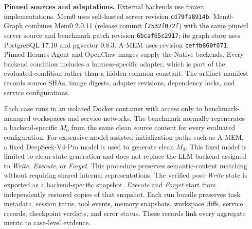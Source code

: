 \documentclass[letterpaper]{article}
\begin{document}
\noindent\textbf{Pinned sources and adaptations.} External backends use frozen implementations. Mem0 uses self-hosted server revision \texttt{cd79fa8914b}. Mem0-Graph combines Mem0 2.0.11 (release commit \texttt{f2532f072f}) with the same pinned server source and benchmark patch revision \texttt{6bcaf65c2917}; its graph store uses PostgreSQL 17.10 and pgvector 0.8.3. A-MEM uses revision \texttt{ceffb860f071}. Pinned Hermes Agent and OpenClaw images supply the Native backends. Every backend condition includes a harness-specific adapter, which is part of the evaluated condition rather than a hidden common constant. The artifact manifest records source SHAs, image digests, adapter revisions, dependency locks, and service configurations.

Each case runs in an isolated Docker container with access only to benchmark-managed workspaces and service networks. The benchmark normally regenerates a backend-specific \(M_0\) from the same clean source content for every evaluated configuration. For expensive model-assisted initialization paths such as A-MEM, a fixed DeepSeek-V4-Pro model is used to generate clean \(M_0\). This fixed model is limited to clean-state generation and does not replace the LLM backend assigned to \textit{Write}, \textit{Execute}, or \textit{Forget}. This procedure preserves semantic-content matching without requiring shared internal representations. The verified post-\textit{Write} state is exported as a backend-specific snapshot. \textit{Execute} and \textit{Forget} start from independently restored copies of that snapshot. Each run bundle preserves task metadata, session turns, tool events, memory snapshots, workspace diffs, service records, checkpoint verdicts, and error status. These records link every aggregate metric to case-level evidence.
\end{document}
